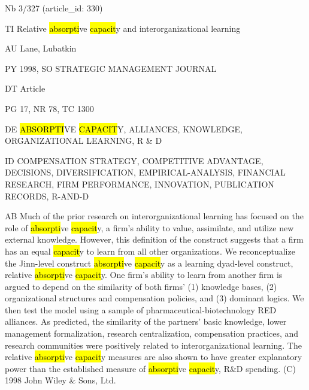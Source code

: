 \documentclass[a4paper]{article}
\begin{document}
\vspace*{-2cm}
Nb \tabto{0cm}3/327 (article\_id: 330)\par
TI \tabto{0cm}Relative \hl{absorpti}ve \hl{capacit}y and interorganizational learning\par
AU \tabto{0cm}Lane, Lubatkin\par
PY \tabto{0cm}1998, SO STRATEGIC MANAGEMENT JOURNAL\par
DT \tabto{0cm}Article\par
PG \tabto{0cm}17, NR 78, TC 1300\par
DE \tabto{0cm}\hl{ABSORPTI}VE \hl{CAPACIT}Y, ALLIANCES, KNOWLEDGE, ORGANIZATIONAL LEARNING, R \& D\par
ID \tabto{0cm}COMPENSATION STRATEGY, COMPETITIVE ADVANTAGE, DECISIONS, DIVERSIFICATION, EMPIRICAL-ANALYSIS, FINANCIAL RESEARCH, FIRM PERFORMANCE, INNOVATION, PUBLICATION RECORDS, R-AND-D\par
AB \tabto{0cm}Much of the prior research on interorganizational learning has focused on the role of \hl{absorpti}ve \hl{capacit}y, a firm's ability to value, assimilate, and utilize new external knowledge. However, this definition of the construct suggests that a firm has an equal \hl{capacit}y to learn from all other organizations. We reconceptualize the Jinn-level construct \hl{absorpti}ve \hl{capacit}y as a learning dyad-level construct, relative \hl{absorpti}ve \hl{capacit}y. One firm's ability to learn from another firm is argued to depend on the similarity of both firms' (1) knowledge bases, (2) organizational structures and compensation policies, and (3) dominant logics. We then test the model using a sample of pharmaceutical-biotechnology RED alliances. As predicted, the similarity of the partners' basic knowledge, lower management formalization, research centralization, compensation practices, and research communities were positively related to interorganizational learning. The relative \hl{absorpti}ve \hl{capacit}y measures are also shown to have greater explanatory power than the established measure of \hl{absorpti}ve \hl{capacit}y, R\&D spending. (C) 1998 John Wiley \& Sons, Ltd.\par
\clearpage
\end{document}
